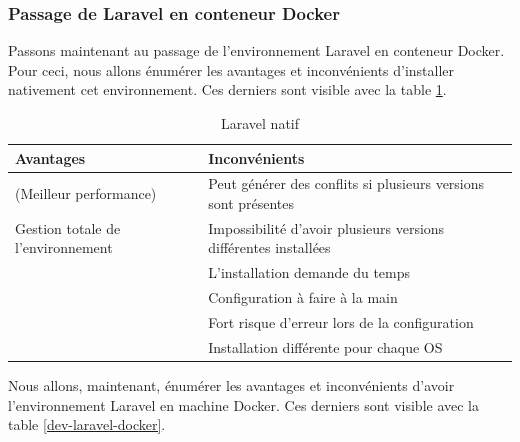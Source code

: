 \documentclass[
    iai, %
    il, %
]{heig-tb}
\begin{document}
\subsubsection{Passage de Laravel en conteneur Docker}
Passons maintenant au passage de l'environnement Laravel en conteneur Docker.\\
Pour ceci, nous allons énumérer les avantages et inconvénients d'installer nativement cet
environnement. Ces derniers sont visible avec la table \ref{dev-laravel-native}.

\begin{table}[h]
    \begin{center}
        \caption{Laravel natif \label{dev-laravel-native}}
        \begin{tabularx}{1.0\textwidth} {X|X}
            Avantages                         & Inconvénients
            \\ \hline
            (Meilleur performance)            & Peut générer des conflits si plusieurs versions sont présentes \\
            Gestion totale de l'environnement & Impossibilité d'avoir plusieurs versions différentes
            installées                                                                                         \\
                                              & L'installation demande du temps                                \\
                                              & Configuration à faire à la main                                \\
                                              & Fort risque d'erreur lors de la configuration                  \\
                                              & Installation différente pour chaque OS                         \\
        \end{tabularx}
    \end{center}
\end{table}

Nous allons, maintenant, énumérer les avantages et inconvénients d'avoir l'environnement Laravel en
machine Docker. Ces derniers sont visible avec la table \ref{dev-laravel-docker}.
\end{document}
